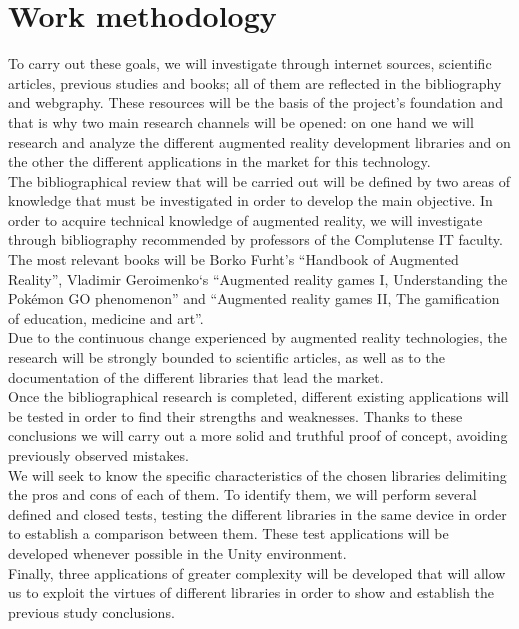 \section{Work methodology}
To carry out these goals, we will investigate through internet sources, scientific articles, previous studies and books; all of them are reflected in the bibliography and webgraphy. These resources will be the basis of the project's foundation and that is why two main research channels will be opened: on one hand we will research and analyze the different augmented reality development libraries and on the other the different applications in the market for this technology.\\


The bibliographical review that will be carried out will be defined by two areas of knowledge that must be investigated in order to develop the main objective. In order to acquire technical knowledge of augmented reality, we will investigate through bibliography recommended by professors of the Complutense IT faculty. The most relevant books will be Borko Furht's “Handbook of Augmented Reality”, Vladimir Geroimenko‘s “Augmented reality games I, Understanding the Pokémon GO phenomenon” and “Augmented reality games II, The gamification of education, medicine and art”.\\

Due to the continuous change experienced by augmented reality technologies, the research will be strongly bounded to scientific articles, as well as to the documentation of the different libraries that lead the market.\\

Once the bibliographical research is completed, different existing applications will be tested in order to find their strengths and weaknesses. Thanks to these conclusions we will carry out a more solid and truthful proof of concept, avoiding previously observed mistakes.\\

We will seek to know the specific characteristics of the chosen libraries delimiting the pros and cons of each of them. To identify them, we will perform several defined and closed tests, testing the different libraries in the same device in order to establish a comparison between them. These test applications will be developed whenever possible in the Unity environment.\\

Finally, three applications of greater complexity will be developed that will allow us to exploit the virtues of different libraries in order to show and establish the previous study conclusions.\\

